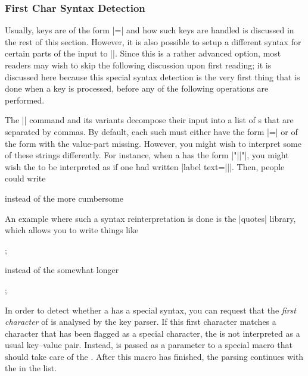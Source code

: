 \subsubsection{First Char Syntax Detection}
\label{sec:pgf:first:char:syntax}

Usually, keys are of the form |=| and how such
keys are handled is discussed in the rest of this section. However, it
is also possible to setup a different syntax for certain parts of the
input to |\pgfkeys|. Since this is a rather advanced option, most
readers may wish to skip the following discussion upon first reading;
it is discussed here because this special syntax detection is the very
first thing that is done when a key is processed, before any of the
following operations are performed.

The |\pgfkeys| command and its variants decompose their input into a
list of s that are separated by commas. By default, each
such  must either have the form |=|
or of the form  with the value-part missing. However, you
might wish to interpret some of these strings differently. For
instance, when a  has the form |"||"|, you
might wish the  to be interpreted as if one had written
|label text={||}|. Then, people could write
\begin{codeexample}
\end{codeexample}
instead of the more cumbersome
\begin{codeexample}
\end{codeexample}
An example where such a syntax reinterpretation is done is the
|quotes| library, which allows you to write things like
\begin{codeexample}[]
\tikz {};
\end{codeexample}
\noindent instead of the somewhat longer
\begin{codeexample}[]
\tikz {};
\end{codeexample}

In order to detect whether a  has a special syntax, you
can request that the \emph{first character} of  is
analysed by the key parser. If this first character matches a
character that has been flagged as a special character, the
 is not interpreted as a usual key--value pair. Instead,
 is passed as a parameter to a special macro that should
take care of the . After this macro has finished, the
parsing continues with the  in the list.

